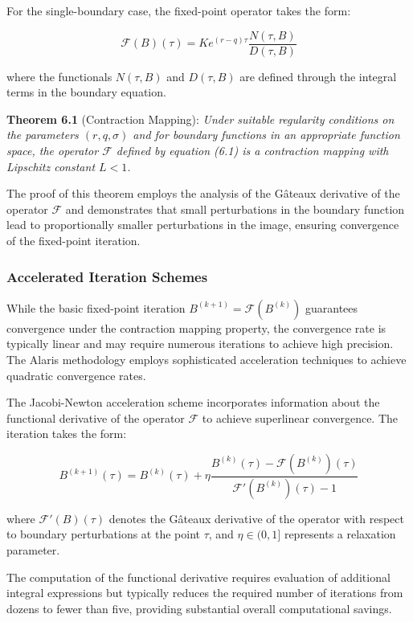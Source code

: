 \documentclass[
  11pt,
  11pt,
  letterpaper,
  onecolumn]{article}
\begin{document}
For the single-boundary case, the fixed-point operator takes the form:

\[\mathcal{F}(B)(\tau) = K e^{(r-q)\tau} \frac{N(\tau,B)}{D(\tau,B)} \tag{6.1}\]

where the functionals \(N(\tau,B)\) and \(D(\tau,B)\) are defined
through the integral terms in the boundary equation.

\textbf{Theorem 6.1} (Contraction Mapping): \emph{Under suitable
regularity conditions on the parameters \((r,q,\sigma)\) and for
boundary functions in an appropriate function space, the operator
\(\mathcal{F}\) defined by equation (6.1) is a contraction mapping with
Lipschitz constant \(L < 1\).}

The proof of this theorem employs the analysis of the Gâteaux derivative
of the operator \(\mathcal{F}\) and demonstrates that small
perturbations in the boundary function lead to proportionally smaller
perturbations in the image, ensuring convergence of the fixed-point
iteration.

\subsubsection{Accelerated Iteration
Schemes}\label{accelerated-iteration-schemes}

While the basic fixed-point iteration
\(B^{(k+1)} = \mathcal{F}(B^{(k)})\) guarantees convergence under the
contraction mapping property, the convergence rate is typically linear
and may require numerous iterations to achieve high precision. The
Alaris methodology employs sophisticated acceleration techniques to
achieve quadratic convergence rates.

The Jacobi-Newton acceleration scheme incorporates information about the
functional derivative of the operator \(\mathcal{F}\) to achieve
superlinear convergence. The iteration takes the form:

\[B^{(k+1)}(\tau) = B^{(k)}(\tau) + \eta \frac{B^{(k)}(\tau) - \mathcal{F}(B^{(k)})(\tau)}{\mathcal{F}'(B^{(k)})(\tau) - 1} \tag{6.2}\]

where \(\mathcal{F}'(B)(\tau)\) denotes the Gâteaux derivative of the
operator with respect to boundary perturbations at the point \(\tau\),
and \(\eta \in (0,1]\) represents a relaxation parameter.

The computation of the functional derivative requires evaluation of
additional integral expressions but typically reduces the required
number of iterations from dozens to fewer than five, providing
substantial overall computational savings.
\end{document}
